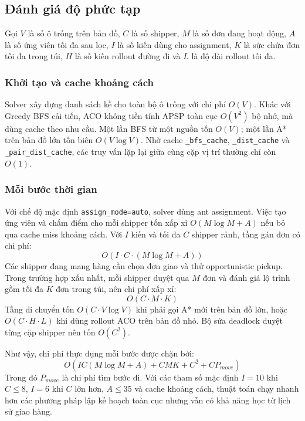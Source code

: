 \documentclass[conference]{IEEEtran}
\begin{document}
\subsection{Đánh giá độ phức tạp}
Gọi $V$ là số ô trống trên bản đồ, $C$ là số shipper, $M$ là số đơn đang hoạt động, $A$ là số ứng viên tối đa sau lọc, $I$ là số kiến dùng cho assignment, $K$ là sức chứa đơn tối đa trong túi, $H$ là số kiến rollout đường đi và $L$ là độ dài rollout tối đa.

\subsubsection{Khởi tạo và cache khoảng cách}
Solver xây dựng danh sách kề cho toàn bộ ô trống với chi phí $O(V)$. Khác với Greedy BFS cải tiến, ACO không tiền tính APSP toàn cục $O(V^2)$ bộ nhớ, mà dùng cache theo nhu cầu. Một lần BFS từ một nguồn tốn $O(V)$; một lần A* trên bản đồ lớn tốn biên $O(V \log V)$. Nhờ cache \texttt{\_bfs\_cache}, \texttt{\_dist\_cache} và \texttt{\_pair\_dist\_cache}, các truy vấn lặp lại giữa cùng cặp vị trí thường chỉ còn $O(1)$.

\subsubsection{Mỗi bước thời gian}
Với chế độ mặc định \texttt{assign\_mode=auto}, solver dùng ant assignment. Việc tạo ứng viên và chấm điểm cho mỗi shipper tốn xấp xỉ $O(M \log M + A)$ nếu bỏ qua cache miss khoảng cách. Với $I$ kiến và tối đa $C$ shipper rảnh, tầng gán đơn có chi phí:
\begin{equation}
O(I \cdot C \cdot (M \log M + A))
\end{equation}
Các shipper đang mang hàng cần chọn đơn giao và thử opportunistic pickup. Trong trường hợp xấu nhất, mỗi shipper duyệt qua $M$ đơn và đánh giá lộ trình gồm tối đa $K$ đơn trong túi, nên chi phí xấp xỉ:
\begin{equation}
O(C \cdot M \cdot K)
\end{equation}
Tầng di chuyển tốn $O(C \cdot V \log V)$ khi phải gọi A* mới trên bản đồ lớn, hoặc $O(C \cdot H \cdot L)$ khi dùng rollout ACO trên bản đồ nhỏ. Bộ sửa deadlock duyệt từng cặp shipper nên tốn $O(C^2)$.

Như vậy, chi phí thực dụng mỗi bước được chặn bởi:
\begin{equation}
O(I C (M \log M + A) + C M K + C^2 + C P_{move})
\end{equation}
Trong đó $P_{move}$ là chi phí tìm bước đi. Với các tham số mặc định $I=10$ khi $C \le 8$, $I=6$ khi $C$ lớn hơn, $A \le 35$ và cache khoảng cách, thuật toán chạy nhanh hơn các phương pháp lập kế hoạch toàn cục nhưng vẫn có khả năng học từ lịch sử giao hàng.
\end{document}
